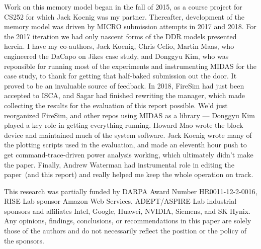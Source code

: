 Work on this memory model began in the fall of 2015, as a course project for
CS252 for which Jack Koenig was my partner. Thereafter, development of the
memory model was driven by MICRO submission attempts in 2017 and 2018. For the
2017 iteration we had only nascent forms of the DDR models presented herein. I
have my co-authors, Jack Koenig, Chris Celio, Martin Maas, who
engineered the DaCapo on Jikes case study, and Donggyu Kim, who was reponsible for
running most of the experiments and instrumenting MIDAS for the case study, to thank for getting that half-baked submission out the door.
It proved to be an invaluable source of feedback.  In 2018, FireSim had just
been accepted to ISCA, and Sagar had finished rewriting the manager, which made
collecting the results for the evaluation of this report possible. We'd just
reorganized FireSim, and other repos using MIDAS as a library --- Donggyu Kim
played a key role in getting everything running.  Howard Mao wrote the
block device and maintained much of the system software.  Jack Koenig wrote
many of the plotting scripts used in the evaluation, and made an eleventh hour
push to get command-trace-driven power analysis working, which ultimately
didn't make the paper. Finally, Andrew Waterman had instrumental role in
editing the paper~(and this report) and really helped me keep the whole
operation on track.

This research was partially funded by DARPA Award Number HR0011-12-2-0016,
RISE Lab sponsor Amazon Web Services, ADEPT/ASPIRE
Lab industrial sponsors and affiliates Intel, Google,
Huawei, NVIDIA, Siemens, and SK Hynix. Any opinions, findings,
conclusions, or recommendations in this paper are solely those of the
authors and do not necessarily reflect the position or the policy of
the sponsors.
